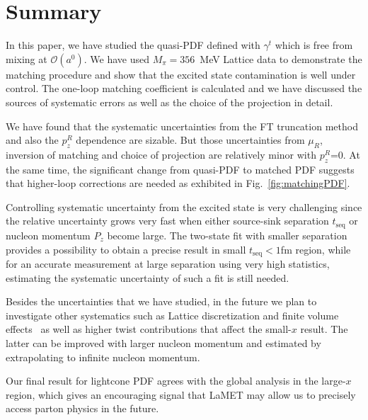 \section{Summary}\label{sec:summary}

In this paper, we have  studied  the quasi-PDF defined with $\gamma^t$ which is free from mixing at $\mathcal{O}(a^0)$. We  have used $M_\pi=356$~MeV Lattice data to demonstrate the matching procedure and show that the excited state contamination is well under control. The one-loop matching coefficient is calculated and we have  discussed the sources of systematic errors as well as the choice of the projection in detail.

We have found  that the systematic uncertainties from the FT truncation method and also the $p_z^R$ dependence are sizable. But  those uncertainties  from $\mu_R$, inversion of matching and choice of projection are relatively minor with $p_z^R$=0. At the same time, the significant change from quasi-PDF to matched PDF suggests that  higher-loop corrections are needed as exhibited in Fig.~\ref{fig:matchingPDF}.


Controlling   systematic uncertainty from the excited state is very challenging since the relative uncertainty grows very fast when either source-sink separation $t_\text{seq}$ or nucleon momentum $P_z$ become large. The two-state fit with smaller separation provides a possibility to obtain a precise result in small $t_\text{seq}<1$fm  region, while for an accurate measurement at large separation using very high statistics, estimating the systematic uncertainty of such a fit is still needed.

Besides the uncertainties that we have studied, in  the future we plan to investigate other systematics such as Lattice discretization and finite volume effects~\cite{Lin:2019ocg} as well as higher twist contributions that affect the small-$x$ result. The latter can be improved with larger nucleon momentum and estimated by extrapolating to infinite nucleon momentum.

Our final result for lightcone PDF agrees with the  global analysis in the large-$x$ region, which gives an encouraging signal  that   LaMET may allow  us to  precisely access  parton physics in the future.


